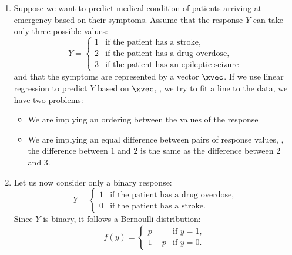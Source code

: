 \begin{examples}\leavevmode
    \begin{enumerate}
        \item Suppose we want to predict medical condition of patients arriving at emergency based on their symptoms. Assume that the response $Y$ can take only three possible values:
              \begin{equation}
                  Y = \begin{cases}
                      1 & \text{if the patient has a stroke},            \\
                      2 & \text{if the patient has a drug overdose},     \\
                      3 & \text{if the patient has an epileptic seizure}
                  \end{cases}
              \end{equation}
              and that the symptoms are represented by a vector $\xvec$. If we use linear regression to predict $Y$ based on $\xvec$, \ie, we try to fit a line to the data, we have two problems:
              \begin{itemize}
                  \item We are implying an ordering between the values of the response
                  \item We are implying an equal difference between pairs of response values, \eg, the difference between $1$ and $2$ is the same as the difference between $2$ and $3$.
              \end{itemize}
        \item Let us now consider only a binary response:
              \begin{equation}
                  Y = \begin{cases}
                      1 & \text{if the patient has a drug overdose}, \\
                      0 & \text{if the patient has a stroke}.
                  \end{cases}
              \end{equation}
              Since $Y$ is binary, it follows a Bernoulli distribution:
              \begin{equation}
                  f(y) = \begin{cases}
                      p     & \text{if } y = 1, \\
                      1 - p & \text{if } y = 0.
                  \end{cases}

\end{equation}
\end{enumerate}
\end{examples}
